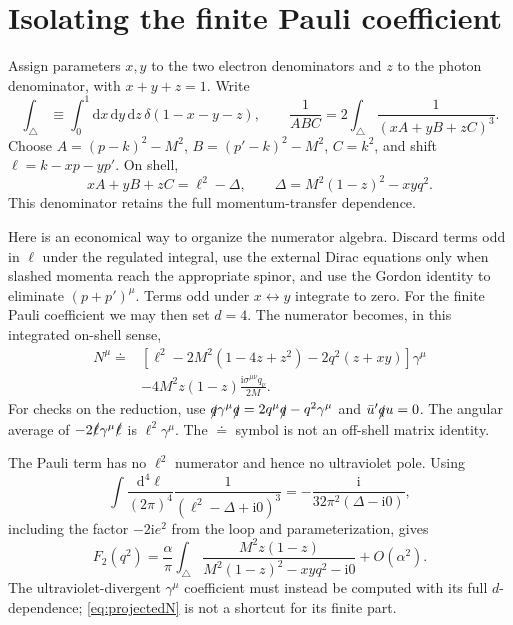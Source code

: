 \documentclass[11pt]{article}
\newcommand{\dd}{\mathrm d}
\newcommand{\ii}{\mathrm i}
\newcommand{\module}[1]{\clearpage\section{#1}}
\begin{document}
\module{Isolating the finite Pauli coefficient}
Assign parameters \(x,y\) to the two electron denominators and \(z\) to
the photon denominator, with \(x+y+z=1\). Write
\begin{equation}
 \int_\triangle\equiv\int_0^1\dd x\,\dd y\,\dd z\,
 \delta(1-x-y-z),\qquad
 \frac1{ABC}=2\int_\triangle\frac1{(xA+yB+zC)^3}.
\end{equation}
Choose \(A=(p-k)^2-M^2\), \(B=(p'-k)^2-M^2\), \(C=k^2\), and shift
\(\ell=k-xp-yp'\). On shell,
\begin{equation}
 xA+yB+zC=\ell^2-\Delta,\qquad
 \Delta=M^2(1-z)^2-xyq^2.
 \label{eq:vertexdelta}
\end{equation}
This denominator retains the full momentum-transfer dependence.

Here is an economical way to organize the numerator algebra. Discard
terms odd in \(\ell\) under the regulated integral, use the external
Dirac equations only when slashed momenta reach the appropriate spinor,
and use the Gordon identity to eliminate \((p+p')^\mu\). Terms odd under
\(x\leftrightarrow y\) integrate to zero. For the finite Pauli coefficient
we may then set \(d=4\). The numerator becomes, in this integrated
on-shell sense,
\begin{align}
 N^\mu\doteq{}&
 [\ell^2-2M^2(1-4z+z^2)-2q^2(z+xy)]\gamma^\mu
 \nonumber\\
 &-4M^2z(1-z)\frac{\ii\sigma^{\mu\nu}q_\nu}{2M}.
 \label{eq:projectedN}
\end{align}
For checks on the reduction, use
\(\slashed q\gamma^\mu\slashed q=2q^\mu\slashed q-q^2\gamma^\mu\)
and \(\bar u'\slashed q u=0\). The angular average of
\(-2\slashed\ell\gamma^\mu\slashed\ell\) is \(\ell^2\gamma^\mu\).
The \(\doteq\) symbol is not an off-shell matrix identity.

The Pauli term has no \(\ell^2\) numerator and hence no ultraviolet pole.
Using
\begin{equation}
 \int\frac{\dd^4\ell}{(2\pi)^4}
 \frac1{(\ell^2-\Delta+\ii0)^3}
 =-\frac{\ii}{32\pi^2(\Delta-\ii0)},
\end{equation}
including the factor \(-2\ii e^2\) from the loop and parameterization,
gives
\begin{equation}
 \boxed{\displaystyle
 F_2(q^2)=\frac{\alpha}{\pi}\int_\triangle
 \frac{M^2z(1-z)}{M^2(1-z)^2-xyq^2-\ii0}+O(\alpha^2).}
 \label{eq:F2}
\end{equation}
The ultraviolet-divergent \(\gamma^\mu\) coefficient must instead be
computed with its full \(d\)-dependence; \eqref{eq:projectedN} is not a
shortcut for its finite part.
\end{document}
